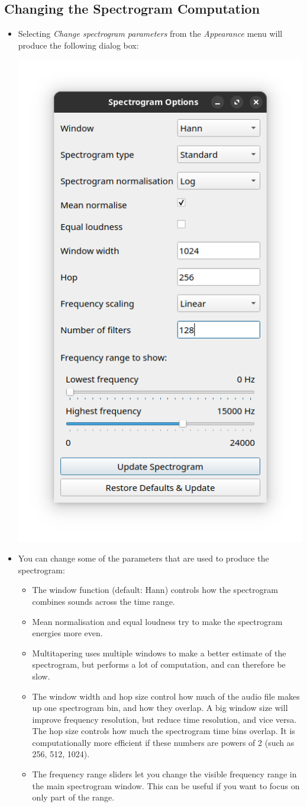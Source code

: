 \documentclass{scrartcl}
\begin{document}
\subsection{Changing the Spectrogram Computation}\label{sec:spectrogram2}

\begin{itemize}
	\item Selecting \textit{Change spectrogram parameters} from the \textit{Appearance} menu will produce the following dialog box:

\begin{center}
    \includegraphics[width=.4\textwidth]{Figures/SpectrogramOptions}
\end{center}

\item You can change some of the parameters that are used to produce the spectrogram:

\begin{itemize}
\item The window function (default: Hann) controls how the spectrogram combines sounds across the time range. 
\item Mean normalisation and equal loudness try to make the spectrogram energies more even.
\item Multitapering uses multiple windows to make a better estimate of the spectrogram, but performs a lot of computation, and can therefore be slow.
\item The window width and hop size control how much of the audio file makes up one spectrogram bin, and how they overlap. A big window size will improve frequency resolution, but reduce time resolution, and vice versa. The hop size controls how much the spectrogram time bins overlap. It is computationally more efficient if these numbers are powers of 2 (such as 256, 512, 1024).
\item The frequency range sliders let you change the visible frequency range in the main spectrogram window. This can be useful if you want to focus on only part of the range.
\end{itemize}


\end{itemize}
\end{document}
